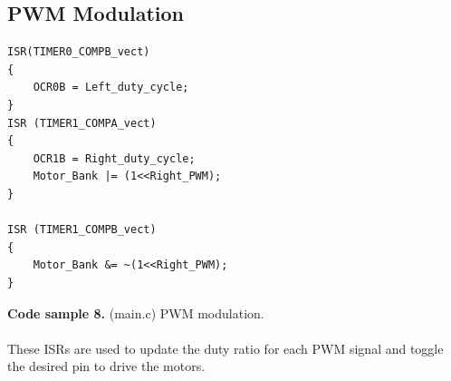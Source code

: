 \documentclass{article}
\begin{document}
\subsection{PWM Modulation}
\begin{lstlisting}
ISR(TIMER0_COMPB_vect)
{
    OCR0B = Left_duty_cycle;
}
ISR (TIMER1_COMPA_vect)
{
    OCR1B = Right_duty_cycle;
    Motor_Bank |= (1<<Right_PWM);
}

ISR (TIMER1_COMPB_vect)
{
    Motor_Bank &= ~(1<<Right_PWM);
}
\end{lstlisting}
\textbf{Code sample 8.} (main.c) PWM modulation. \\\\
These ISRs are used to update the duty ratio for each PWM signal and toggle the desired pin to drive the motors. \\\\
\end{document}
